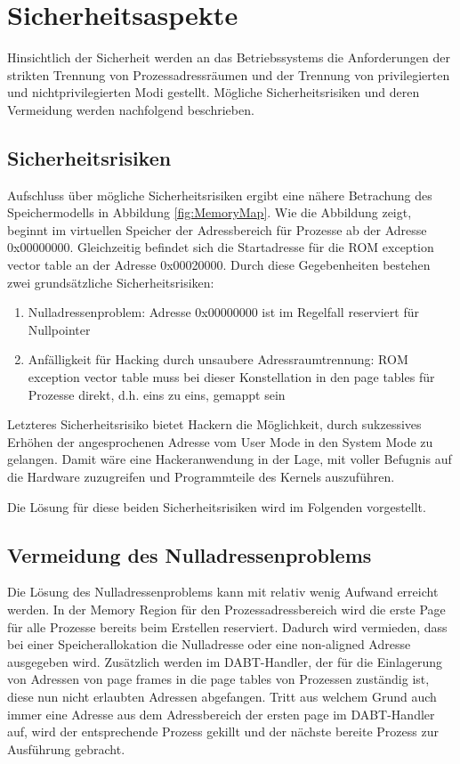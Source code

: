 \section{Sicherheitsaspekte}
\label{chapSecurity}

Hinsichtlich der Sicherheit werden an das Betriebssystems die Anforderungen der strikten Trennung von Prozessadressräumen und der Trennung von privilegierten und nichtprivilegierten Modi gestellt. Mögliche Sicherheitsrisiken und deren Vermeidung werden nachfolgend beschrieben.

 

\subsection{Sicherheitsrisiken}

Aufschluss über mögliche Sicherheitsrisiken ergibt eine nähere Betrachung des Speichermodells in Abbildung \ref{fig:MemoryMap}. Wie die Abbildung zeigt, beginnt im virtuellen Speicher der Adressbereich für Prozesse ab der Adresse 0x00000000. Gleichzeitig befindet sich die Startadresse für die ROM exception vector table an der Adresse 0x00020000. Durch diese Gegebenheiten bestehen zwei grundsätzliche Sicherheitsrisiken:

\begin{enumerate}
	\item Nulladressenproblem: Adresse 0x00000000 ist im Regelfall reserviert für Nullpointer
	\item Anfälligkeit für Hacking durch unsaubere Adressraumtrennung: ROM exception vector table muss bei dieser Konstellation in den page tables für Prozesse direkt, d.h. eins zu eins, gemappt sein
\end{enumerate}

Letzteres Sicherheitsrisiko bietet Hackern die Möglichkeit, durch sukzessives Erhöhen der angesprochenen Adresse vom User Mode in den System Mode zu gelangen. Damit wäre eine Hackeranwendung in der Lage, mit voller Befugnis auf die Hardware zuzugreifen und Programmteile des Kernels auszuführen.

Die Lösung für diese beiden Sicherheitsrisiken wird im Folgenden vorgestellt.

\subsection{Vermeidung des Nulladressenproblems}

Die Lösung des Nulladressenproblems kann mit relativ wenig Aufwand erreicht werden. In der Memory Region für den Prozessadressbereich wird die erste Page für alle Prozesse bereits beim Erstellen reserviert. Dadurch wird vermieden, dass bei einer Speicherallokation die Nulladresse oder eine non-aligned Adresse ausgegeben wird. Zusätzlich werden im DABT-Handler, der für die Einlagerung von Adressen von page frames in die page tables von Prozessen zuständig ist, diese nun nicht erlaubten Adressen abgefangen. Tritt aus welchem Grund auch immer eine Adresse aus dem Adressbereich der ersten page im DABT-Handler auf, wird der entsprechende Prozess gekillt und der nächste bereite Prozess zur Ausführung gebracht.


